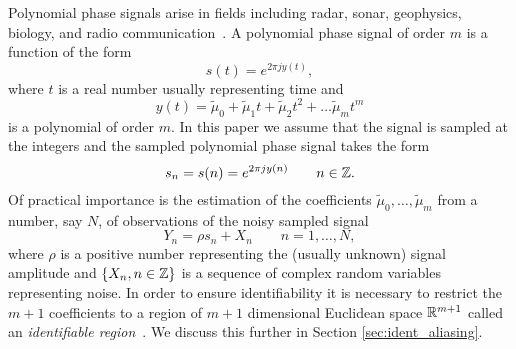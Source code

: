 \documentclass[journal]{IEEEtran}
\begin{document}
Polynomial phase signals arise in fields including radar, sonar, geophysics, biology, and radio communication~\cite{Hlawatsch_lin_quad_time_freq_spmag_1992,Ridleyspeechpolyphase1989, Suga_1975_bats_echolocation,Angeby_estimating_2000}. %
A polynomial phase signal of order $m$ is a function of the form
\[
s(t) = e^{2\pi j y(t)},
\]
where $t$ is a real number usually representing time and 
\[
y(t) = \tilde{\mu}_0 +\tilde{\mu}_1 t + \tilde{\mu}_2 t^2 + \dots \tilde{\mu}_m t^m
\]
is a polynomial of order $m$.  In this paper we assume that the signal is sampled at the integers and the sampled polynomial phase signal takes the form
\[
s_n = s(n) = e^{2\pi j y(n)} \qquad n\in{\mathbb Z}.
\] 
Of practical importance is the estimation of the coefficients $\tilde{\mu}_0, \dots, \tilde{\mu}_m$ from a number, say $N$, of observations of the noisy sampled signal
\begin{equation}\label{eq:Y_nsamplednoisey}
Y_n = \rho s_n + X_n \qquad n = 1, \dots, N,
\end{equation}
where $\rho$ is a positive number representing the (usually unknown) signal amplitude and $\{X_n, n \in {\mathbb Z}\}$ is a sequence of complex random variables representing noise. In order to ensure identifiability it is necessary to restrict the $m+1$ coefficients to a region of $m+1$ dimensional Euclidean space ${\mathbb R}^{m+1}$ called an \emph{identifiable region}~\cite{McKilliam2009IndentifiabliltyAliasingPolyphase}.  %
We discuss this further in Section \ref{sec:ident_aliasing}.
\end{document}

